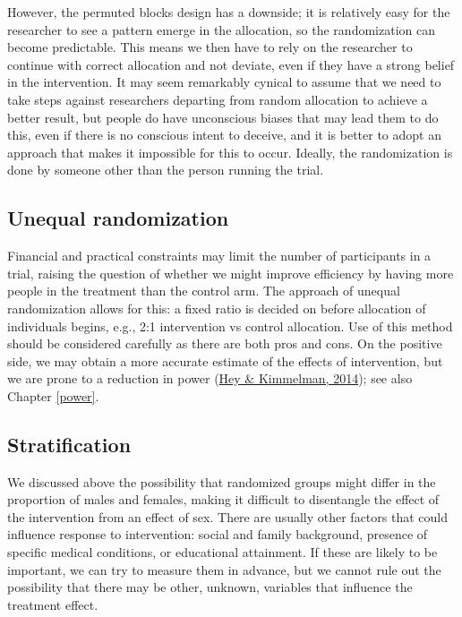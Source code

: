 \documentclass{krantz}
\begin{document}
However, the permuted blocks design has a downside; it is relatively easy for the researcher to see a pattern emerge in the allocation, so the randomization can become predictable. This means we then have to rely on the researcher to continue with correct allocation and not deviate, even if they have a strong belief in the intervention. It may seem remarkably cynical to assume that we need to take steps against researchers departing from random allocation to achieve a better result, but people do have unconscious biases that may lead them to do this, even if there is no conscious intent to deceive, and it is better to adopt an approach that makes it impossible for this to occur. Ideally, the randomization is done by someone other than the person running the trial.

\hypertarget{unequal-randomization}{%
\subsection{Unequal randomization}\label{unequal-randomization}}

Financial and practical constraints may limit the number of participants in a trial, raising the question of whether we might improve efficiency by having more people in the treatment than the control arm. The approach of unequal randomization allows for this: a fixed ratio is decided on before allocation of individuals begins, e.g., 2:1 intervention vs control allocation. Use of this method should be considered carefully as there are both pros and cons. On the positive side, we may obtain a more accurate estimate of the effects of intervention, but we are prone to a reduction in power (\protect\hyperlink{ref-hey2014}{Hey \& Kimmelman, 2014}); see also Chapter \ref{power}.

\hypertarget{stratification}{%
\subsection{Stratification}\label{stratification}}

We discussed above the possibility that randomized groups might differ in the proportion of males and females, making it difficult to disentangle the effect of the intervention from an effect of sex. There are usually other factors that could influence response to intervention: social and family background, presence of specific medical conditions, or educational attainment. If these are likely to be important, we can try to measure them in advance, but we cannot rule out the possibility that there may be other, unknown, variables that influence the treatment effect.
\end{document}
